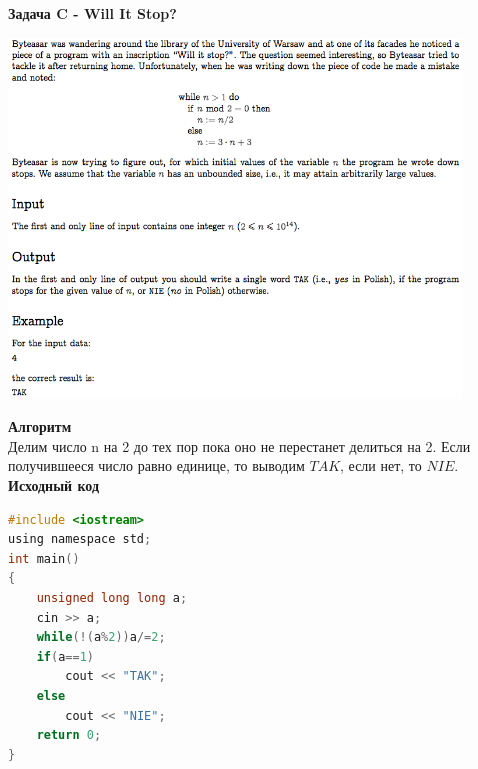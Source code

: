 \documentclass[a4paper,12pt]{article}
\begin{document}
\textbf{{\large Задача C - Will It Stop?}} \\
\begin{center}
\includegraphics[width=0.9\textwidth]{CT_S02E07/CT_S02E07_C.png}\\ [1cm]
\end{center}
\textbf{{\large Алгоритм}} \\
Делим число n на 2 до тех пор пока оно не перестанет делиться на 2. Если получившееся число равно единице, то выводим $TAK$, если нет, то $NIE$. \\ 

\textbf{{\large Исходный код}}
\begin{lstlisting}[language=C]
#include <iostream>
using namespace std;
int main()
{
    unsigned long long a;
    cin >> a;
    while(!(a%2))a/=2;
    if(a==1)
        cout << "TAK";
    else
        cout << "NIE";
    return 0;
}
\end{lstlisting}
\end{document}
